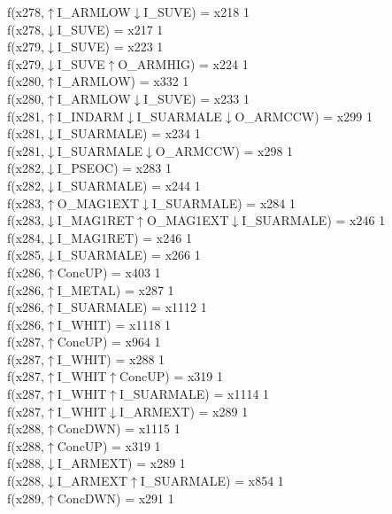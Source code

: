f(x278,$\uparrow$I\_ARMLOW$\downarrow$I\_SUVE) = x218 {1} \\
f(x278,$\downarrow$I\_SUVE) = x217 {1} \\
f(x279,$\downarrow$I\_SUVE) = x223 {1} \\
f(x279,$\downarrow$I\_SUVE$\uparrow$O\_ARMHIG) = x224 {1} \\
f(x280,$\uparrow$I\_ARMLOW) = x332 {1} \\
f(x280,$\uparrow$I\_ARMLOW$\downarrow$I\_SUVE) = x233 {1} \\
f(x281,$\uparrow$I\_INDARM$\downarrow$I\_SUARMALE$\downarrow$O\_ARMCCW) = x299 {1} \\
f(x281,$\downarrow$I\_SUARMALE) = x234 {1} \\
f(x281,$\downarrow$I\_SUARMALE$\downarrow$O\_ARMCCW) = x298 {1} \\
f(x282,$\downarrow$I\_PSEOC) = x283 {1} \\
f(x282,$\downarrow$I\_SUARMALE) = x244 {1} \\
f(x283,$\uparrow$O\_MAG1EXT$\downarrow$I\_SUARMALE) = x284 {1} \\
f(x283,$\downarrow$I\_MAG1RET$\uparrow$O\_MAG1EXT$\downarrow$I\_SUARMALE) = x246 {1} \\
f(x284,$\downarrow$I\_MAG1RET) = x246 {1} \\
f(x285,$\downarrow$I\_SUARMALE) = x266 {1} \\
f(x286,$\uparrow$ConcUP) = x403 {1} \\
f(x286,$\uparrow$I\_METAL) = x287 {1} \\
f(x286,$\uparrow$I\_SUARMALE) = x1112 {1} \\
f(x286,$\uparrow$I\_WHIT) = x1118 {1} \\
f(x287,$\uparrow$ConcUP) = x964 {1} \\
f(x287,$\uparrow$I\_WHIT) = x288 {1} \\
f(x287,$\uparrow$I\_WHIT$\uparrow$ConcUP) = x319 {1} \\
f(x287,$\uparrow$I\_WHIT$\uparrow$I\_SUARMALE) = x1114 {1} \\
f(x287,$\uparrow$I\_WHIT$\downarrow$I\_ARMEXT) = x289 {1} \\
f(x288,$\uparrow$ConcDWN) = x1115 {1} \\
f(x288,$\uparrow$ConcUP) = x319 {1} \\
f(x288,$\downarrow$I\_ARMEXT) = x289 {1} \\
f(x288,$\downarrow$I\_ARMEXT$\uparrow$I\_SUARMALE) = x854 {1} \\
f(x289,$\uparrow$ConcDWN) = x291 {1} \\
